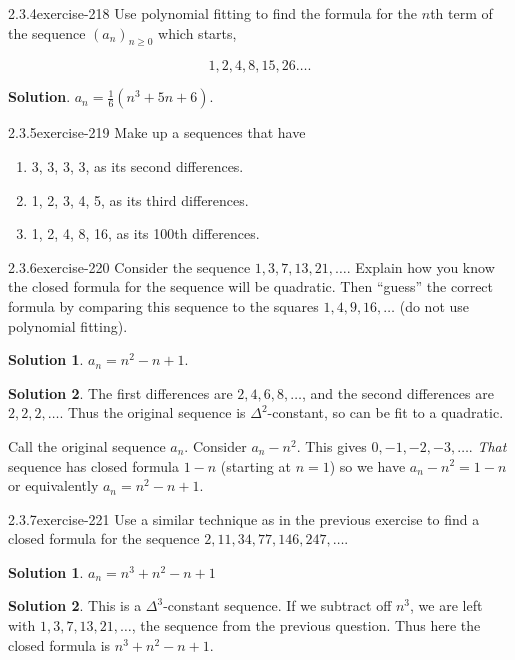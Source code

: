 \documentclass[twoside,11pt,]{book}
\numberwithin{equation}{chapter}
\begin{document}
\begin{divisionsolution}{2.3.4}{}{exercise-218}%
\hypertarget{p-3338}{}%
Use polynomial fitting to find the formula for the \(n\)th term of the sequence \((a_n)_{n \ge 0}\) which starts,%
\par
\hypertarget{p-3339}{}%
%
\begin{equation*}
1, 2, 4, 8, 15, 26 \ldots 
\text{.}
\end{equation*}
%
\par\smallskip%
\noindent\textbf{Solution}.\quad%
\hypertarget{p-3340}{}%
\(a_n = \frac{1}{6} (n^3 + 5n + 6)\text{.}\)%
\end{divisionsolution}%
\begin{divisionsolution}{2.3.5}{}{exercise-219}%
\hypertarget{p-3341}{}%
Make up a sequences that have\leavevmode%
\begin{enumerate}[label=(\alph*)]
\item\hypertarget{li-1930}{}3, 3, 3, 3, \textellipsis{} as its second differences.%
\item\hypertarget{li-1931}{}1, 2, 3, 4, 5, \textellipsis{} as its third differences.%
\item\hypertarget{li-1932}{}1, 2, 4, 8, 16, \textellipsis{} as its 100th differences.%
\end{enumerate}
%
\end{divisionsolution}%
\begin{divisionsolution}{2.3.6}{}{exercise-220}%
\hypertarget{p-3342}{}%
Consider the sequence \(1, 3, 7, 13, 21, \ldots\). Explain how you know the closed formula for the sequence will be quadratic. Then ``guess'' the correct formula by comparing this sequence to the squares \(1, 4, 9, 16, \ldots\) (do not use polynomial fitting).%
\par\smallskip%
\noindent\textbf{Solution 1}.\quad%
\hypertarget{p-3343}{}%
\(a_n = n^2 - n + 1\).%
\par\smallskip%
\noindent\textbf{Solution 2}.\quad%
\hypertarget{p-3344}{}%
The first differences are \(2, 4, 6, 8, \ldots\), and the second differences are \(2, 2, 2, \ldots\). Thus the original sequence is \(\Delta^2\)-constant, so can be fit to a quadratic.%
\par
\hypertarget{p-3345}{}%
Call the original sequence \(a_n\). Consider \(a_n - n^2\). This gives \(0, -1, -2, -3, \ldots\). \emph{That} sequence has closed formula \(1-n\) (starting at \(n = 1\)) so we have \(a_n - n^2 = 1-n\) or equivalently \(a_n = n^2 - n + 1\).%
\end{divisionsolution}%
\begin{divisionsolution}{2.3.7}{}{exercise-221}%
\hypertarget{p-3346}{}%
Use a similar technique as in the previous exercise to find a closed formula for the sequence \(2, 11, 34, 77, 146, 247,\ldots\).%
\par\smallskip%
\noindent\textbf{Solution 1}.\quad%
\hypertarget{p-3347}{}%
\(a_n = n^3 + n^2 - n + 1\)%
\par\smallskip%
\noindent\textbf{Solution 2}.\quad%
\hypertarget{p-3348}{}%
This is a \(\Delta^3\)-constant sequence. If we subtract off \(n^3\), we are left with \(1, 3, 7, 13, 21, \ldots\), the sequence from the previous question. Thus here the closed formula is \(n^3 + n^2 - n + 1\).%
\end{divisionsolution}%
\end{document}
